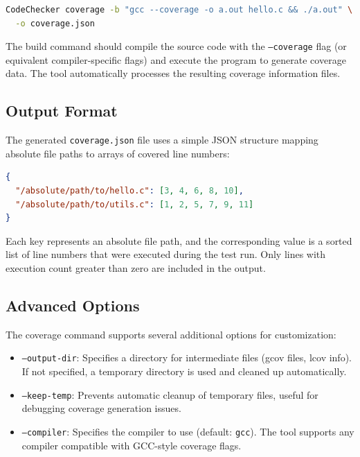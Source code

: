 \begin{lstlisting}[language=bash, caption={Using a build command for coverage generation}]
CodeChecker coverage -b "gcc --coverage -o a.out hello.c && ./a.out" \
  -o coverage.json
\end{lstlisting}

The build command should compile the source code with the \texttt{--coverage} flag (or equivalent compiler-specific flags) and execute the program to generate coverage data. The tool automatically processes the resulting coverage information files.

\subsection{Output Format}

The generated \texttt{coverage.json} file uses a simple JSON structure mapping absolute file paths to arrays of covered line numbers:

\begin{lstlisting}[language=json, caption={Example coverage.json structure}]
{
  "/absolute/path/to/hello.c": [3, 4, 6, 8, 10],
  "/absolute/path/to/utils.c": [1, 2, 5, 7, 9, 11]
}
\end{lstlisting}

Each key represents an absolute file path, and the corresponding value is a sorted list of line numbers that were executed during the test run. Only lines with execution count greater than zero are included in the output.

\subsection{Advanced Options}

The coverage command supports several additional options for customization:

\begin{itemize}
    \item \texttt{--output-dir}: Specifies a directory for intermediate files (gcov files, lcov info). If not specified, a temporary directory is used and cleaned up automatically.
    \item \texttt{--keep-temp}: Prevents automatic cleanup of temporary files, useful for debugging coverage generation issues.
    \item \texttt{--compiler}: Specifies the compiler to use (default: \texttt{gcc}). The tool supports any compiler compatible with GCC-style coverage flags.
\end{itemize}

